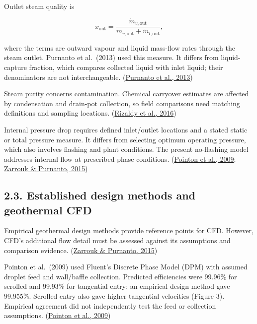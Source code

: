 \documentclass[
  12pt,
  a4paper,
]{article}
\begin{document}
Outlet steam quality is

\[
x_{\mathrm{out}}=
\frac{\dot m_{v,\mathrm{out}}}
{\dot m_{v,\mathrm{out}}+\dot m_{l,\mathrm{out}}},
\]

where the terms are outward vapour and liquid mass-flow rates through
the steam outlet. Purnanto et al.~(2013) used this measure. It differs
from liquid-capture fraction, which compares collected liquid with inlet
liquid; their denominators are not interchangeable.
(\href{https://www.researchgate.net/publication/269519626_CFD_MODELLING_OF_TWO-PHASE_FLOW_INSIDE_GEOTHERMAL_STEAM-WATER_SEPARATORS}{Purnanto
et al., 2013})

Steam purity concerns contamination. Chemical carryover estimates are
affected by condensation and drain-pot collection, so field comparisons
need matching definitions and sampling locations.
(\href{https://www.researchgate.net/publication/310818568_LIQUID_CARRYOVER_IN_GEOTHERMAL_STEAM-WATER_SEPARATORS}{Rizaldy
et al., 2016})

Internal pressure drop requires defined inlet/outlet locations and a
stated static or total pressure measure. It differs from selecting
optimum operating pressure, which also involves flashing and plant
conditions. The present no-flashing model addresses internal flow at
prescribed phase conditions.
(\href{https://publications.mygeoenergynow.org/grc/1028587.pdf}{Pointon
et al., 2009};
\href{https://doi.org/10.1016/j.geothermics.2014.05.009}{Zarrouk \&
Purnanto, 2015})

\subsection{2.3. Established design methods and geothermal
CFD}\label{established-design-methods-and-geothermal-cfd}

Empirical geothermal design methods provide reference points for CFD.
However, CFD's additional flow detail must be assessed against its
assumptions and comparison evidence.
(\href{https://doi.org/10.1016/j.geothermics.2014.05.009}{Zarrouk \&
Purnanto, 2015})

Pointon et al.~(2009) used Fluent's Discrete Phase Model (DPM) with
assumed droplet feed and wall/baffle collection. Predicted efficiencies
were 99.96\% for scrolled and 99.93\% for tangential entry; an empirical
design method gave 99.955\%. Scrolled entry also gave higher tangential
velocities (Figure 3). Empirical agreement did not independently test
the feed or collection assumptions.
(\href{https://publications.mygeoenergynow.org/grc/1028587.pdf}{Pointon
et al., 2009})
\end{document}
